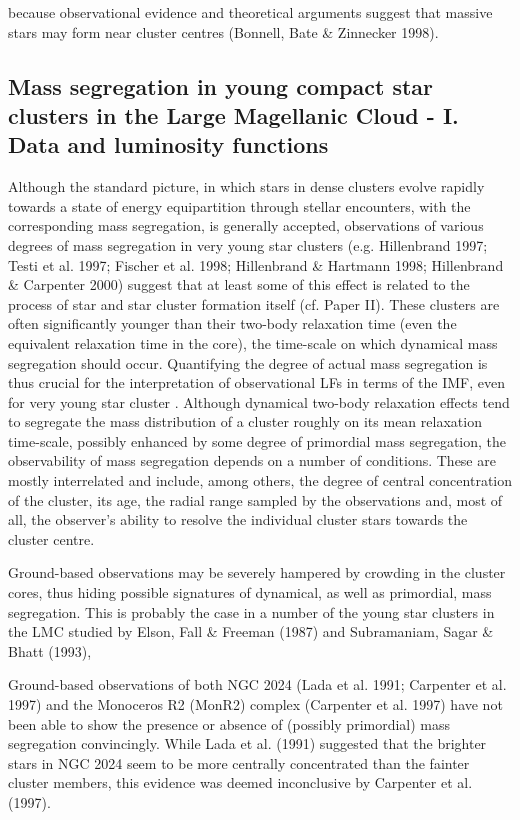 \documentclass[../main.tex]{subfiles}
\begin{document}
because observational evidence and theoretical arguments suggest that massive stars may form near cluster centres (Bonnell, Bate & Zinnecker 1998).

\subsection{Mass segregation in young compact star clusters in the Large Magellanic Cloud - I. Data and luminosity functions}


Although the standard picture, in which stars in dense clusters
evolve rapidly towards a state of energy equipartition through
stellar encounters, with the corresponding mass segregation, is
generally accepted, observations of various degrees of mass
segregation in very young star clusters (e.g. Hillenbrand 1997;
Testi et al. 1997; Fischer et al. 1998; Hillenbrand & Hartmann
1998; Hillenbrand & Carpenter 2000) suggest that at least some of this effect is related to the process of star and star cluster formation
itself (cf. Paper II). These clusters are often significantly younger
than their two-body relaxation time (even the equivalent relaxation
time in the core), the time-scale on which dynamical mass
segregation should occur. Quantifying the degree of actual mass
segregation is thus crucial for the interpretation of observational
LFs in terms of the IMF, even for very young star cluster .
Although dynamical two-body relaxation effects tend to
segregate the mass distribution of a cluster roughly on its mean
relaxation time-scale, possibly enhanced by some degree of
primordial mass segregation, the observability of mass segregation
depends on a number of conditions. These are mostly interrelated
and include, among others, the degree of central concentration of
the cluster, its age, the radial range sampled by the observations
and, most of all, the observer’s ability to resolve the individual
cluster stars towards the cluster centre.

Ground-based observations may be severely
hampered by crowding in the cluster cores, thus hiding possible
signatures of dynamical, as well as primordial, mass segregation.
This is probably the case in a number of the young star clusters in
the LMC studied by Elson, Fall & Freeman (1987) and
Subramaniam, Sagar & Bhatt (1993),

Ground-based observations of both NGC 2024 (Lada et al. 1991;
Carpenter et al. 1997) and the Monoceros R2 (MonR2) complex
(Carpenter et al. 1997) have not been able to show the presence or
absence of (possibly primordial) mass segregation convincingly.
While Lada et al. (1991) suggested that the brighter stars in NGC
2024 seem to be more centrally concentrated than the fainter
cluster members, this evidence was deemed inconclusive by
Carpenter et al. (1997).
\end{document}
